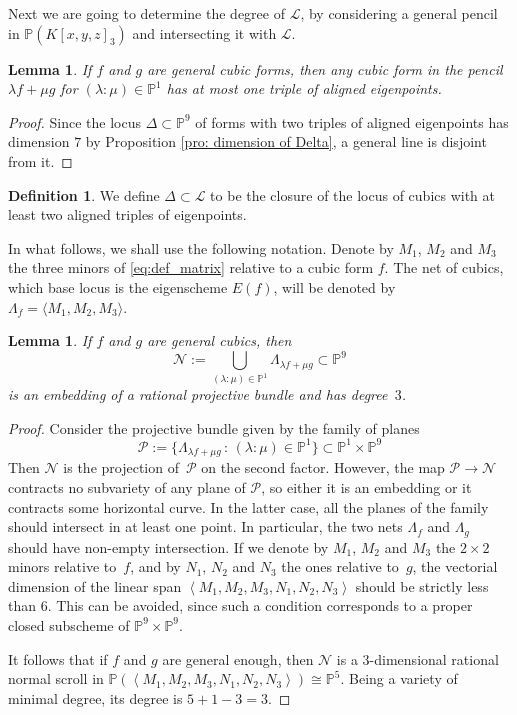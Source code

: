 \documentclass{amsart}
\theoremstyle{plain}
\newtheorem{lem}[theorem]{Lemma}
\theoremstyle{definition}
\newtheorem{definition}[theorem]{Definition}
\newcommand{\p}{\mathbb{P}}
\newcommand{\sL}{\mathcal{L}}
\begin{document}
Next we are going to determine the degree of $\sL$, by considering a general pencil in $\p(K[x,y,z]_3)$
and intersecting it with $\sL$. 
\begin{lem}
\label{lem:pencil_one_aligned}
 If $f$ and $g$ are general cubic forms, then any cubic form in the pencil $\lambda f + \mu g$ for $(\lambda: \mu) \in \p^1$ has at most one triple of aligned eigenpoints.
\end{lem}

\begin{proof}
Since the locus $\Delta \subset \p^9$ of forms with two triples of aligned eigenpoints has dimension $7$ by Proposition \ref{pro: dimension of Delta}, a general line is disjoint from it.
\end{proof}
\begin{definition}
 We define $\Delta \subset \mathcal{L}$ to be the closure of the locus of cubics with at least two aligned triples of eigenpoints.
\end{definition}

In what follows, we shall use the following notation.
Denote by $M_1$, $M_2$ and $M_3$ the three minors of \ref{eq:def_matrix} relative to a cubic form $f$.
The net of cubics, which base locus is the eigenscheme $E(f)$, will be denoted by $\Lambda_f = \langle M_1, M_2, M_3 \rangle$. 
\begin{lem}
\label{lem:scroll}
 If $f$ and $g$ are general cubics, then
 \[
   \mathcal{N} := \bigcup_{(\lambda : \mu) \in \p^1} \Lambda_{\lambda f + \mu g} \subset \p^9
 \]
 is an embedding of a rational projective bundle and has degree~$3$.
\end{lem}
\begin{proof}
Consider the projective bundle given by the family of planes
%
\[
{\mathcal P} := \{ \Lambda_{\lambda f + \mu g} \, : \, (\lambda: \mu)\in \p^1 \} \subset \p^1 \times \p^9
\]
%
Then $\mathcal{N}$ is the projection of~$\mathcal{P}$ on the second factor.
However, the map ${\mathcal P} \to {\mathcal N}$ contracts no subvariety of any plane of ${\mathcal P}$, so either it is an embedding or it contracts some horizontal curve. In the latter case, all the planes of the family should intersect in at least one point. In particular, the two nets $\Lambda_f$ and $\Lambda_g$ should have non-empty intersection.
If we denote by $M_1$, $M_2$ and $M_3$ the $2 \times 2$ minors relative to~$f$, and by $N_1$, $N_2$ and $N_3$ the ones relative to~$g$, the vectorial dimension of the linear span $\left\langle M_1, M_2, M_3, N_1, N_2, N_3 \right\rangle$ should be strictly less than $6$. This can be avoided, since such a condition corresponds to a proper closed subscheme of $\p^9 \times \p^9$.

It follows that if $f$ and $g$ are general enough, then $\mathcal{N}$ is a $3$-dimensional rational normal scroll in $\p(\left\langle M_1, M_2, M_3, N_1, N_2, N_3 \right\rangle) \cong \p^5$. 
Being a variety of minimal degree, its degree is $5+1-3 = 3$.
\end{proof}
\end{document}
